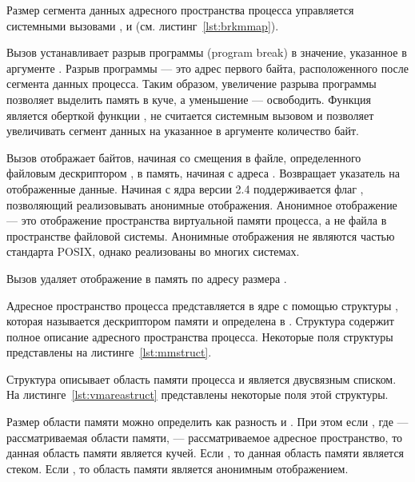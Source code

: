 Размер сегмента данных адресного пространства процесса управляется системными вызовами ,  и  (см. листинг~\ref{lst:brkmmap}).



Вызов  устанавливает разрыв программы (program break) в значение, указанное в аргументе . Разрыв программы --- это адрес первого байта, расположенного после сегмента данных процесса. Таким образом, увеличение разрыва программы позволяет выделить память в куче, а уменьшение --- освободить. Функция  является оберткой функции , не считается системным вызовом и позволяет увеличивать сегмент данных на указанное в аргументе количество байт.

Вызов  отображает  байтов, начиная со смещения  в файле, определенного файловым дескриптором , в память, начиная с адреса . Возвращает  указатель на отображенные данные. Начиная с ядра версии 2.4 поддерживается флаг , позволяющий реализовывать анонимные отображения. Анонимное отображение --- это отображение пространства виртуальной памяти процесса, а не файла в пространстве файловой системы. Анонимные отображения не являются частью стандарта POSIX, однако реализованы во многих системах.

Вызов  удаляет отображение в память по адресу  размера .

Адресное пространство процесса представляется в ядре с помощью структуры , которая называется дескриптором памяти и определена в . Структура содержит полное описание адресного пространства процесса. Некоторые поля структуры  представлены на листинге~\ref{lst:mmstruct}.



Структура  описывает область памяти процесса и является двусвязным списком. На листинге~\ref{lst:vmareastruct} представлены некоторые поля этой структуры.



Размер области памяти можно определить как разность  и . При этом если , где  --- рассматриваемая области памяти,  --- рассматриваемое адресное пространство, то данная область памяти является кучей. Если , то данная область памяти является стеком. Если , то область памяти является анонимным отображением.

